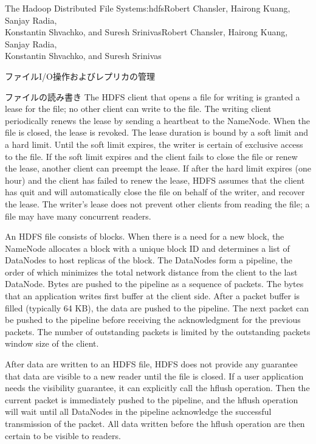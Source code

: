 \begin{aosachaptertoc}{The Hadoop Distributed File System}{s:hdfs}{Robert Chansler, Hairong Kuang, Sanjay Radia, \\ Konstantin Shvachko, and Suresh Srinivas}{Robert Chansler, Hairong Kuang, Sanjay Radia, \\ \hspace*{0.9cm} Konstantin Shvachko, and Suresh Srinivas}
\begin{aosasect1}{ファイルI/O操作およびレプリカの管理}
\begin{aosasect2}{ファイルの読み書き}
The HDFS client that opens a file for writing is granted a lease for
the file; no other client can write to the file.  The writing client
periodically renews the lease by sending a heartbeat to the
NameNode. When the file is closed, the lease is revoked. The lease
duration is bound by a soft limit and a hard limit. Until the soft
limit expires, the writer is certain of exclusive access to the
file. If the soft limit expires and the client fails to close the file
or renew the lease, another client can preempt the lease. If after the
hard limit expires (one hour) and the client has failed to renew the
lease, HDFS assumes that the client has quit and will automatically
close the file on behalf of the writer, and recover the lease. The
writer's lease does not prevent other clients from reading the file; a
file may have many concurrent readers.

An HDFS file consists of blocks. When there is a need for a new block,
the NameNode allocates a block with a unique block ID and determines a
list of DataNodes to host replicas of the block.  The DataNodes form a
pipeline, the order of which minimizes the total network distance from
the client to the last DataNode. Bytes are pushed to the pipeline as a
sequence of packets. The bytes that an application writes first buffer
at the client side. After a packet buffer is filled (typically 64 KB),
the data are pushed to the pipeline. The next packet can be pushed to
the pipeline before receiving the acknowledgment for the previous
packets.  The number of outstanding packets is limited by the
outstanding packets window size of the client.

After data are written to an HDFS file, HDFS does not provide any
guarantee that data are visible to a new reader until the file is
closed. If a user application needs the visibility guarantee, it can
explicitly call the hflush operation. Then the current packet is
immediately pushed to the pipeline, and the hflush operation will wait
until all DataNodes in the pipeline acknowledge the successful
transmission of the packet. All data written before the hflush
operation are then certain to be visible to readers.



\end{aosasect2}
\end{aosasect1}
\end{aosachaptertoc}
